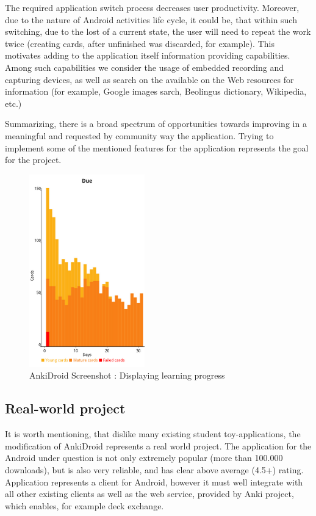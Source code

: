 \documentclass[a4paper,11pt,twoside]{article}
\begin{document}
The required application switch process decreases user productivity. Moreover, due to the 
nature of Android activities life cycle, it could be, that within such switching, due to the lost
of a current state, the user will need to repeat the work twice (creating cards, after unfinished was discarded, for example).
This motivates adding to the application itself information providing capabilities. Among such capabilities we 
consider the usage of embedded recording and capturing devices, as well as search on the available on the Web resources
for information (for example, Google images sarch, Beolingus dictionary, Wikipedia, etc.)

Summarizing, there is a broad spectrum of opportunities towards improving in a meaningful and requested by community
way the application. Trying to implement some of the mentioned features for the application represents the goal for the project.


\begin{figure}[t]
\centering
\label{fig:Learnproc}
\includegraphics[width=5cm]{Screenshot2}
\caption{AnkiDroid Screenshot : Displaying learning progress}
\end{figure}

\subsection{Real-world project}

It is worth mentioning, that dislike many existing student toy-applications, the modification of AnkiDroid represents a real world project.
The application for the Android under question is not only extremely popular (more than 100.000 downloads), but is also very reliable,
and has clear above average (4.5+) rating. Application represents a client for Android, however it must well integrate with all other
existing clients as well as the web service, provided by Anki project, which enables, for example deck exchange.
\end{document}
